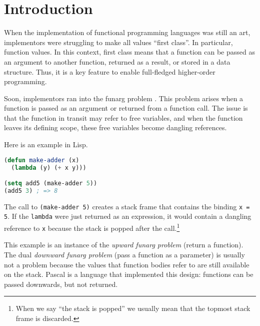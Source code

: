 \documentclass[sigplan,dvipsnames,screen]{acmart}
\begin{document}
\maketitle
{}

\section{Introduction}

When the implementation of functional programming languages was still
an art, implementors were struggling to make all values ``first
class''. In particular, function values. In this context, first
class means that a function can be passed as an argument to another
function, returned as a result, or stored in a data structure. Thus,
it is a key feature to enable full-fledged higher-order programming.

Soon, implementors ran into the funarg problem \cite{moses70:_funct_lisp_funar}. This problem arises
when a function is passed as an argument or returned from a function
call. The issue is that the function in transit may refer to free
variables, and when the function leaves its defining scope, these free
variables become dangling references. 

Here is an example in Lisp.
\begin{lstlisting}[language=lisp]
(defun make-adder (x)
  (lambda (y) (+ x y)))

(setq add5 (make-adder 5))
(add5 3) ; => 8
\end{lstlisting}
The call to \lstinline|(make-adder 5)| creates a stack frame that
contains the binding \texttt{x = 5}. If the \lstinline|lambda| were just
returned as an expression, it would contain a dangling reference to
\texttt{x} because the stack is popped after the call.\footnote{When
  we say ``the stack is popped'' we usually mean that the topmost
  stack frame is discarded.}

This example is an instance of the \emph{upward funarg problem}
(return a function). The
dual \emph{downward funarg problem} (pass a function as a parameter)
is usually not a problem 
because the values that function bodies refer to are still available
on the stack. Pascal \cite{jensen91:_pascal} is a language that implemented this design:
functions can be passed downwards, but not returned. 
\end{document}
